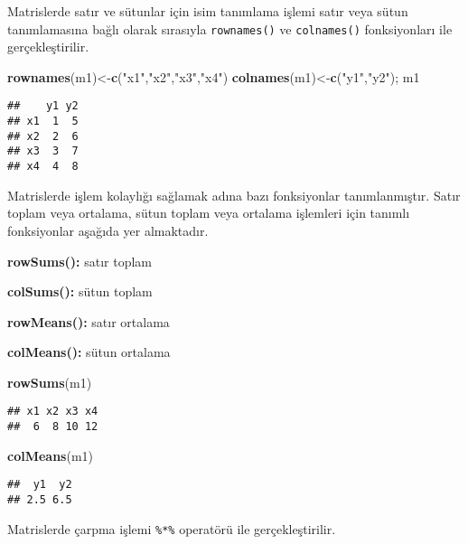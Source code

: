 \documentclass[
]{book}
\newenvironment{Shaded}{\begin{snugshade}}{\end{snugshade}}
\newcommand{\KeywordTok}[1]{\textcolor[rgb]{0.13,0.29,0.53}{\textbf{#1}}}
\newcommand{\NormalTok}[1]{#1}
\newcommand{\StringTok}[1]{\textcolor[rgb]{0.31,0.60,0.02}{#1}}
\begin{document}
Matrislerde satır ve sütunlar için isim tanımlama işlemi satır veya sütun tanımlamasına bağlı olarak sırasıyla \texttt{rownames()} ve \texttt{colnames()} fonksiyonları ile gerçekleştirilir.

\begin{Shaded}
\begin{Highlighting}[]
\KeywordTok{rownames}\NormalTok{(m1)<-}\KeywordTok{c}\NormalTok{(}\StringTok{"x1"}\NormalTok{,}\StringTok{"x2"}\NormalTok{,}\StringTok{"x3"}\NormalTok{,}\StringTok{"x4"}\NormalTok{)}
\KeywordTok{colnames}\NormalTok{(m1)<-}\KeywordTok{c}\NormalTok{(}\StringTok{"y1"}\NormalTok{,}\StringTok{"y2"}\NormalTok{); m1}
\end{Highlighting}
\end{Shaded}

\begin{verbatim}
##    y1 y2
## x1  1  5
## x2  2  6
## x3  3  7
## x4  4  8
\end{verbatim}

Matrislerde işlem kolaylığı sağlamak adına bazı fonksiyonlar tanımlanmıştır. Satır toplam veya ortalama, sütun toplam veya ortalama işlemleri için tanımlı fonksiyonlar aşağıda yer almaktadır.

\textbf{rowSums():} satır toplam

\textbf{colSums():} sütun toplam

\textbf{rowMeans():} satır ortalama

\textbf{colMeans():} sütun ortalama

\begin{Shaded}
\begin{Highlighting}[]
\KeywordTok{rowSums}\NormalTok{(m1)}
\end{Highlighting}
\end{Shaded}

\begin{verbatim}
## x1 x2 x3 x4 
##  6  8 10 12
\end{verbatim}

\begin{Shaded}
\begin{Highlighting}[]
\KeywordTok{colMeans}\NormalTok{(m1)}
\end{Highlighting}
\end{Shaded}

\begin{verbatim}
##  y1  y2 
## 2.5 6.5
\end{verbatim}

Matrislerde çarpma işlemi \texttt{\%*\%} operatörü ile gerçekleştirilir.
\end{document}
